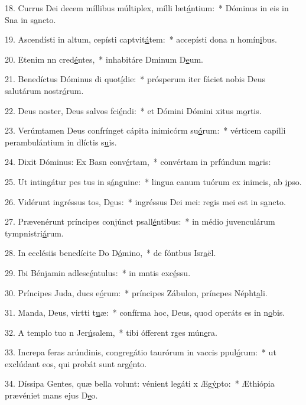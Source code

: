 18. Currus Dei decem míllibus múltiplex, mílli læt\uline{á}ntium:~* Dóminus in eis in Sna in s\uline{a}ncto.\par 
19. Ascendísti in altum, cepísti captvit\uline{á}tem:~* accepísti dona n homín\uline{i}bus.\par 
20. Etenim nn cred\uline{é}ntes,~* inhabitáre Dminum D\uline{e}um.\par 
21. Benedíctus Dóminus di quot\uline{í}die:~* prósperum iter fáciet nobis Deus salutárum nostr\uline{ó}rum.\par 
22. Deus noster, Deus salvos fci\uline{é}ndi:~* et Dómini Dómini xitus m\uline{o}rtis.\par 
23. Verúmtamen Deus confrínget cápita inimicórm su\uline{ó}rum:~* vérticem capílli perambulántium in dlíctis s\uline{u}is.\par 
24. Dixit Dóminus: Ex Basn conv\uline{é}rtam,~* convértam in prfúndum m\uline{a}ris:\par 
25. Ut intingátur pes tus in s\uline{á}nguine:~* lingua canum tuórum ex inimcis, ab \uline{i}pso.\par 
26. Vidérunt ingréssus tos, D\uline{e}us:~* ingréssus Dei mei: regis mei  est in s\uline{a}ncto.\par 
27. Prævenérunt príncipes conjúnct psall\uline{é}ntibus:~* in médio juvenculárum tympnistri\uline{á}rum.\par 
28. In ecclésiis benedícite Do D\uline{ó}mino,~* de fóntbus Isr\uline{a}ël.\par 
29. Ibi Bénjamin adlesc\uline{é}ntulus:~* in mntis exc\uline{é}ssu.\par 
30. Príncipes Juda, ducs e\uline{ó}rum:~* príncipes Zábulon, príncpes Népht\uline{a}li.\par 
31. Manda, Deus, virtti t\uline{u}æ:~* confírma hoc, Deus, quod operáts es in n\uline{o}bis.\par 
32. A templo tuo n Jer\uline{ú}salem,~* tibi ófferent rges mún\uline{e}ra.\par 
33. Increpa feras arúndinis, congregátio taurórum in vaccis ppul\uline{ó}rum:~* ut exclúdant eos, qui probát sunt arg\uline{é}nto.\par 
34. Díssipa Gentes, quæ bella volunt: vénient legáti x Æg\uline{ý}pto:~* Æthiópia prævéniet mans ejus D\uline{e}o.\par 
